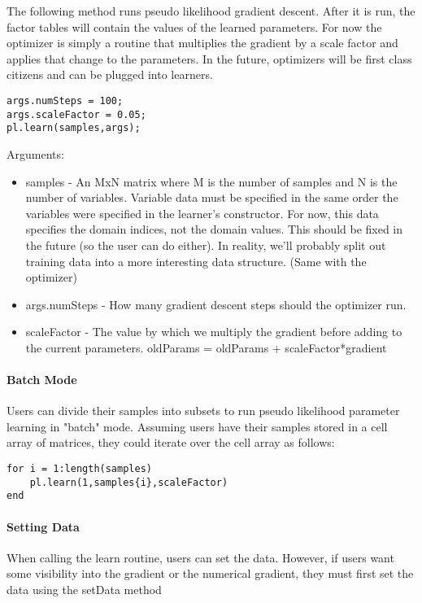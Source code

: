 The following method runs pseudo likelihood gradient descent.  After it is run, the factor tables will contain the values of the learned parameters.  For now the optimizer is simply a routine that multiplies the gradient by a scale factor and applies that change to the parameters.  In the future, optimizers will be first class citizens and can be plugged into learners.

\begin{lstlisting}
args.numSteps = 100;
args.scaleFactor = 0.05;
pl.learn(samples,args);
\end{lstlisting}

Arguments:
\begin{itemize}
\item samples - An MxN matrix where M is the number of samples and N is the number of variables.  Variable data must be specified in the same order the variables were specified in the learner's constructor.  For now, this data specifies the domain indices, not the domain values.  This should be fixed in the future (so the user can do either).  In reality, we'll probably split out training data into a more interesting data structure.  (Same with the optimizer) 
\item args.numSteps - How many gradient descent steps should the optimizer run. 
\item scaleFactor - The value by which we multiply the gradient before adding to the current parameters.  oldParams = oldParams + scaleFactor*gradient
\end{itemize}


\paragraph{Batch Mode}
Users can divide their samples into subsets to run pseudo likelihood parameter learning in "batch" mode.  Assuming users have their samples stored in a cell array of matrices, they could iterate over the cell array as follows:

\begin{lstlisting}
for i = 1:length(samples)
    pl.learn(1,samples{i},scaleFactor)
end
\end{lstlisting}

 \paragraph{Setting Data}
When calling the learn routine, users can set the data.  However, if users want some visibility into the gradient or the numerical gradient, they must first set the data using the setData method

